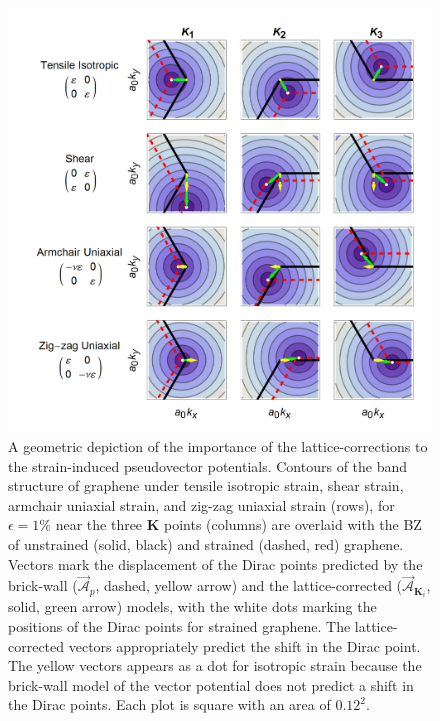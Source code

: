 \begin{figure}
  \begin{center}
  \includegraphics[scale=.75]{Figs_PVP/VPs.png}
  \end{center}
  \caption[Lattice-corrected strain-induced pseudovector potentials]{\label{fig:PVP:PVPshifts}
  A geometric depiction of the importance of the lattice-corrections to the strain-induced pseudovector potentials.
  Contours of the band structure of graphene under tensile isotropic strain, shear strain, armchair uniaxial strain, and zig-zag uniaxial strain (rows), for $\epsilon=1\%$ near the three $\bm{K}$ points (columns) are overlaid with the BZ of unstrained (solid, black) and strained (dashed, red) graphene.
  Vectors mark the displacement of the Dirac points predicted by the brick-wall ($\vec{\mathcal{A}}_p$, dashed, yellow arrow) and the lattice-corrected ($\vec{\mathcal{A}}_{\bm{K}_{i}}$, solid, green arrow) models, with the white dots marking the positions of the Dirac points for strained graphene.
  The lattice-corrected vectors appropriately predict the shift in the Dirac point.
  The yellow vectors appears as a dot for isotropic strain because the brick-wall model of the vector potential does not predict a shift in the Dirac points.
  Each plot is square with an area of $0.12^2$.
  }
\end{figure}

